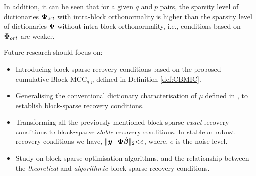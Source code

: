 In addition, it can be seen that for a given $q$ and $p$ pairs, the sparsity level of dictionaries $\boldsymbol{\Phi}_{ort}$ with intra-block orthonormality is higher than the sparsity level of dictionaries $\boldsymbol{\Phi}$ without intra-block orthonormality, i.e., conditions based on $\boldsymbol{\Phi}_{ort}$ are weaker.


\newpage
Future research should focus on:
\begin{itemize}
\item Introducing block-sparse recovery conditions based on the proposed cumulative Block-MCC$_{q,p}$ defined in Definition \ref{def:CBMIC}.
\item Generalising the conventional dictionary characterisation of $\mu$ defined in \cite{Donoho2003}, to establish block-sparse recovery conditions.
\item  Transforming all the previously mentioned block-sparse \emph{exact} recovery conditions to block-sparse \emph{stable} recovery conditions.
In stable or robust recovery conditions we have, $\Vert \boldsymbol{y} {-} \boldsymbol{\Phi} \hat{\boldsymbol{\beta}} \Vert_{2} {<} e$, where, $e$ is the noise level.
\item Study on block-sparse optimisation algorithms, and the relationship between the \emph{theoretical} and \emph{algorithmic} block-sparse recovery conditions.
\end{itemize}
\newpage




